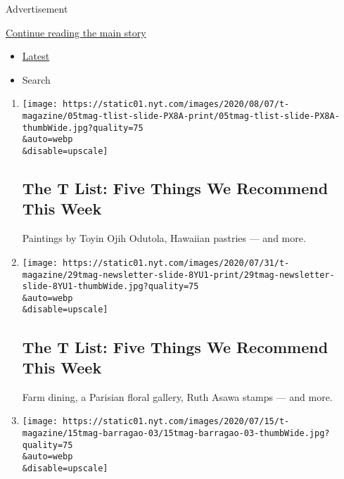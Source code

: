 Advertisement

\protect\hyperlink{after-mid1}{Continue reading the main story}

\begin{itemize}
\tightlist
\item
  \protect\hyperlink{stream-panel}{Latest}
\item
  Search
\end{itemize}

\begin{enumerate}
\def\labelenumi{\arabic{enumi}.}
\item
  \href{/2020/08/06/t-magazine/t-list-toyin-ojih-odutola.html}{}

  \texttt{[image: https://static01.nyt.com/images/2020/08/07/t-magazine/05tmag-tlist-slide-PX8A-print/05tmag-tlist-slide-PX8A-thumbWide.jpg?quality=75\\\&auto=webp\\\&disable=upscale]}

  \hypertarget{the-t-list-five-things-we-recommend-this-week}{%
  \subsection{The T List: Five Things We Recommend This
  Week}\label{the-t-list-five-things-we-recommend-this-week}}

  Paintings by Toyin Ojih Odutola, Hawaiian pastries --- and more.
\item
  \href{/2020/07/30/t-magazine/the-t-list-five-things-we-recommend-this-week.html}{}

  \texttt{[image: https://static01.nyt.com/images/2020/07/31/t-magazine/29tmag-newsletter-slide-8YU1-print/29tmag-newsletter-slide-8YU1-thumbWide.jpg?quality=75\\\&auto=webp\\\&disable=upscale]}

  \hypertarget{the-t-list-five-things-we-recommend-this-week-1}{%
  \subsection{The T List: Five Things We Recommend This
  Week}\label{the-t-list-five-things-we-recommend-this-week-1}}

  Farm dining, a Parisian floral gallery, Ruth Asawa stamps --- and
  more.
\item
  \href{/2020/07/17/t-magazine/summer-recipes-arjamolho-soup-vanessa-barragao.html}{}

  \texttt{[image: https://static01.nyt.com/images/2020/07/15/t-magazine/15tmag-barragao-03/15tmag-barragao-03-thumbWide.jpg?quality=75\\\&auto=webp\\\&disable=upscale]}


\end{enumerate}
